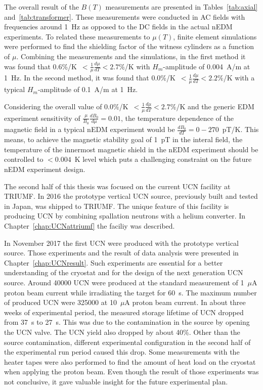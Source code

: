 The overall result of the $B(T)$ measurements are presented in
Tables~\ref{tab:axial} and~\ref{tab:transformer}. These measurements
were conducted in AC fields with frequencies around 1~Hz as opposed to
the DC fields in the actual nEDM experiments. To related these
measurements to $\mu(T)$, finite element simulations were performed to
find the shielding factor of the witness cylinders as a function of
$\mu$. Combining the measurements and the simulations, in the first
method it was found that
0.6\%/K~$<\frac{1}{\mu}\frac{d\mu}{dT}<2.7\%$/K with $H_m$-amplitude
of 0.004~A/m at 1~Hz. In the second method, it was found that
0.0\%/K~$<\frac{1}{\mu}\frac{d\mu}{dT}<2.2\%$/K with a typical
$H_m$-amplitude of 0.1~A/m at 1~Hz.

Considering the overall value of
0.0\%/K~$<\frac{1}{\mu}\frac{d\mu}{dT}<2.7$\%/K and the generic EDM
experiment sensitivity of $\frac{\mu}{B_0}\frac{dB_0}{d\mu}=0.01$, the
temperature dependence of the magnetic field in a typical nEDM
experiment would be $\frac{dB_0}{dT}=0-270$~pT/K. This means, to
achieve the magnetic stability goal of 1~pT in the interal field, the
temperature of the innermost magnetic shield in the nEDM experiment
should be controlled to $<0.004$~K level which puts a challenging
constraint on the future nEDM experiment design.

The second half of this thesis was focused on the current UCN facility
at TRIUMF. In 2016 the prototype vertical UCN source, previously built
and tested in Japan, was shipped to TRIUMF. The unique feature of this
facility is producing UCN by combining spallation neutrons with a
helium converter. In Chapter~\ref{chap:UCNattriumf} the faciliy was
described.

In November 2017 the first UCN were produced with the prototype
vertical source. Those experiments and the result of data analysis
were presented in Chapter~\ref{chap:UCNresult}. Such experiments are
essential for a better understanding of the cryostat and for the
design of the next generation UCN source. Around 40000 UCN were
produced at the standard measurement of 1~$\mu$A proton beam current
while irradiating the target for 60~s. The maximum number of produced
UCN were 325000 at 10~$\mu$A proton beam current. In about three weeks
of experimental period, the measured storage lifetime of UCN dropped
from 37~s to 27~s. This was due to the contamination in the source by
opening the UCN valve. The UCN yield also dropped by about 40\%. Other
than the source contamination, different experimental configuration in
the second half of the experimental run period caused this drop.  Some
measurements with the heater tapes were also performed to find the
amount of heat load on the cryostat when applying the proton
beam. Even though the result of those experiments was not conclusive,
it gave valuable insight for the future experimental plan.








